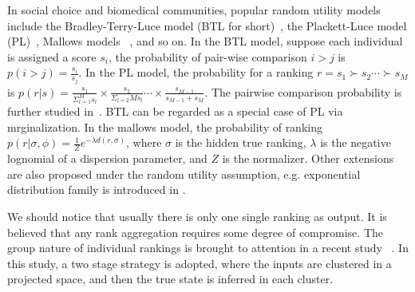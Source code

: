 \documentclass[sigconf]{acmart}
\begin{document}
In social choice and biomedical communities, popular random utility models include the Bradley-Terry-Luce model (BTL for short)~\cite{Hunter2004MM}, the Plackett-Luce model (PL)~\cite{AzariSoufiani2013Generalized}, Mallows models ~\cite{Lu2011Learning}, and so on. In the BTL model, suppose each individual is assigned a score $s_i$, the probability of pair-wise comparison $i>j$ is $p(i>j)=\frac{s_i}{s_j}$. In the PL model, the probability for a ranking $r=s_1 \succ s_2 \cdots \succ s_M$ is $ p(r|s)=\frac{s_1}{\Sigma_{l=1}^{M} s_l} \times \frac{s_2}{\Sigma_{l=2}{M} s_l} \cdots \times \frac{s_{M-1}}{s_{M-1}+s_{M}}$. The pairwise comparison probability is further studied in~\cite{Gleich2011Rank}. BTL can be regarded as a special case of PL via mrginalization. In the mallows model, the probability of ranking $p(r|\sigma,\phi)=\frac{1}{Z} e^{-\lambda d(r,\sigma)}$, where $\sigma$ is the hidden true ranking, $\lambda$ is the negative lognomial of a dispersion parameter, and $Z$ is the normalizer. Other extensions are also proposed under the random utility assumption, e.g. exponential distribution family is introduced in \cite{Parkes2012Random}.

We should notice that usually there is only one single ranking as output. It is believed that any rank aggregation requires some degree of compromise. The group nature of individual rankings is brought to attention in a recent study ~\cite{Wu2015Clustering}. In this study, a two stage strategy is adopted, where the inputs are clustered in a projected space, and then the true state is inferred in each cluster.


\end{document}
